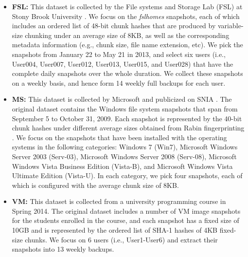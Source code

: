\documentclass[bachelor]{thesis-uestc}
\begin{document}
\begin{itemize}[leftmargin=*]
\item 
\textbf{FSL:} This dataset is collected by the File systems and
        Storage Lab (FSL) at Stony Brook University \cite{sun16,FSL14,sun18}. We focus on
the {\em fslhomes} snapshots, each of which includes an ordered list of 48-bit
chunk hashes that are produced by variable-size chunking under an average size
of 8KB, as well as the corresponding metadata information (e.g., chunk size,
file name extension, etc). We pick the snapshots from January 22 to May 21 in
2013, and select six users (i.e., User004, User007, User012, User013, User015,
and User028) that have the complete daily snapshots over the whole duration.
We collect these snapshots on a weekly basis, and hence form 14 weekly full
backups for each user.  
\item 
\textbf{MS:} This dataset is collected by Microsoft
\cite{meyer11} and publicized on SNIA \cite{ms}. The original dataset contains
the Windows file system snapshots that span from September 5 to October 31,
2009. Each snapshot is represented by the 40-bit chunk hashes under different
average sizes obtained from Rabin fingerprinting \cite{rabin81}.  We focus on
the snapshots that have been installed with the operating systems in the
following categories: Windows 7 (Win7), Microsoft Windows Server 2003
(Serv-03), Microsoft Windows Server 2008 (Serv-08), Microsoft Windows Vista
Business Edition (Vista-B), and Microsoft Windows Vista Ultimate Edition
(Vista-U). In each category, we pick four snapshots, each of which is
configured with the average chunk size of 8KB.   
\item 
\textbf{VM:} This dataset is collected from a university programming course in
Spring 2014. The original dataset includes a number of VM image snapshots for
the students enrolled in the course, and each snapshot has a fixed size of
10GB and is represented by the ordered list of SHA-1 hashes of 4KB fixed-size
chunks. We focus on 6 users (i.e., User1-User6) and extract their snapshots
into 13 weekly backups.  
\end{itemize}
\end{document}
